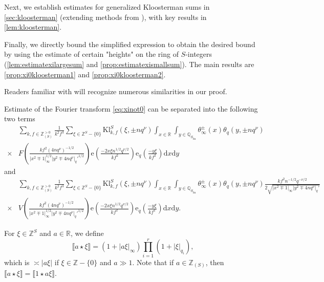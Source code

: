 \documentclass[10pt,oneside,reqno]{amsart}
\makeatletter
\newcommand\rmd{\mathrm{d}}
\newcommand\rme{\mathrm{e}}
\newcommand\QQ{\mathbb{Q}}
\newcommand\RR{\mathbb{R}}
\newcommand\ZZ{\mathbb{Z}}
\newcommand\fin{\mathrm{fin}}
\newcommand\Kl{\mathrm{Kl}}
\newcommand\legendresymbol[2]{\genfrac{(}{)}{}{}{#1}{#2}}
\def\subsection{\@startsection{subsection}{2}
  \z@{3pt\@plus0pt}{-.5em}%
  {\normalfont\bfseries}}
\theoremstyle{THEOREM}
\theoremstyle{DEFINITION}
\theoremstyle{EXERCISE}
\numberwithin{equation}{section}
\makeatother
\begin{document}
Next, we establish estimates for generalized Kloosterman sums in \autoref{sec:kloosterman} (extending methods from \cite[Appendix B]{altug2017}), with key results in \autoref{lem:kloosterman}.

Finally, we directly bound the simplified expression to obtain the desired bound by using the estimate of certain "heights" on the ring of $S$-integers (\autoref{lem:estimatexilargesum} and \autoref{prop:estimatexismallsum}). The main results are \autoref{prop:xi0kloosterman1} and \autoref{prop:xi0kloosterman2}.

Readers familiar with \cite[Section 4.2 and Appendices A and B]{altug2017} will recognize numerous similarities in our proof.

\subsection{Estimate of the Fourier transform}\label{subsec:fourierestimate}
\eqref{eq:xinot0} can be separated into the following two terms
\begin{equation}\label{eq:xi0firstterm}
\begin{split}
  &\sum_{k,f\in \ZZ_{(S)}^{>0}}\frac{1}{k^2f^3}\sum_{\xi\in \ZZ^S-\{0\}}\Kl_{k,f}^S(\xi,\pm nq^\nu)
   \int_{x\in\RR}\int_{y\in\QQ_{S_\fin}}\theta_\infty^\pm(x)\theta_{q}(y,\pm nq^\nu) \\
   \times&F\legendresymbol{kf^2(4nq^\nu)^{-1/2}}{|x^2\mp 1|_\infty^{1/2}|y^2\mp 4nq^\nu|_q'^{1/2}}\rme\legendresymbol{-2x\xi n^{1/2}q^{\nu/2}}{kf^2}\rme_{q}\legendresymbol{-y\xi}{kf^2}\rmd x\rmd y
\end{split}
\end{equation}
and
\begin{equation}\label{eq:xi0secondterm}
\begin{split}
  &\sum_{k,f\in \ZZ_{(S)}^{>0}}\frac{1}{k^2f^3}\sum_{\xi\in \ZZ^S-\{0\}}\Kl_{k,f}^S(\xi,\pm nq^\nu)
   \int_{x\in\RR}\int_{y\in\QQ_{S_\fin}}\theta_\infty^\pm(x)\theta_{q}(y,\pm nq^\nu)\frac{kf^2n^{-1/2}q^{-\nu/2}}{2\sqrt{|x^2\mp 1|_\infty|y^2\mp 4nq^\nu|_q'}} \\ \times&V\legendresymbol{kf^2(4nq^\nu)^{-1/2}}{|x^2\mp 1|_\infty^{1/2}|y^2\mp 4nq^\nu|_q'^{1/2}}\rme\legendresymbol{-2x\xi n^{1/2}q^{\nu/2}}{kf^2}\rme_{q}\legendresymbol{-y\xi}{kf^2}\rmd x\rmd y.
\end{split}
\end{equation}

For $\xi\in \ZZ^S$ and $a\in \RR$, we define 
\[
\llbracket a \star \xi\rrbracket=(1+|a\xi|_\infty)\prod_{i=1}^{r}(1+|\xi|_{q_i}),
\]
which is $\asymp|a\xi|$ if $\xi\in \ZZ-\{0\}$ and $a\gg 1$.
Note that if $a\in \ZZ_{(S)}$, then $\llbracket a \star \xi\rrbracket=\llbracket 1 \star a\xi\rrbracket$.
\end{document}
